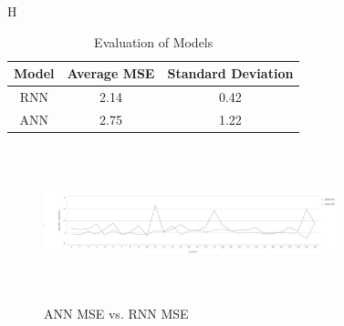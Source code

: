 \begin{table}{H}
\begin{center}
\begin{tabular}{ c | c | c }
    \hline
     \textbf{Model} &  \textbf{Average MSE} &    \textbf{Standard Deviation}\\ \hline
    RNN&  2.14&  0.42 \\ \hline
    ANN&  2.75&  1.22\\ \hline
      \hline
  \end{tabular}
\caption{Evaluation of Models}
 \label{table:nnRnn}
\end{center}
 \end{table}
\begin{figure}
\label{fig:errors}
\center
\includegraphics[width=8.5cm,height=4.5cm]{Figures/errors.JPG}
\caption{ANN MSE vs. RNN MSE}
\end{figure}

 
 

 
 
